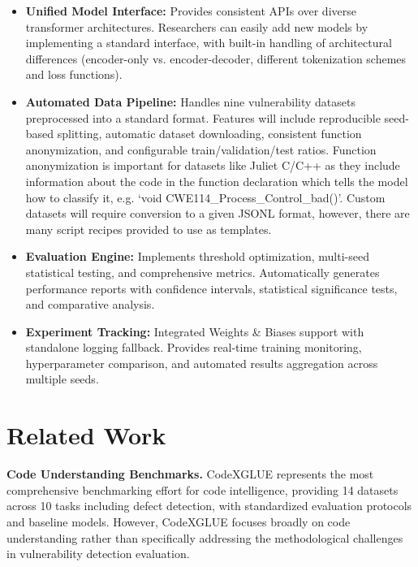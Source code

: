 \documentclass[letterpaper]{article}
\begin{document}
\begin{itemize}
	\item \textbf{Unified Model Interface:} Provides consistent APIs over diverse transformer architectures. Researchers can easily add new models by implementing a standard interface, with built-in handling of architectural differences (encoder-only vs. encoder-decoder, different tokenization schemes and loss functions).

	\item \textbf{Automated Data Pipeline:} Handles nine vulnerability datasets preprocessed into a standard format. Features will include reproducible seed-based splitting, automatic dataset downloading, consistent function anonymization, and configurable train/validation/test ratios. Function anonymization is important for datasets like Juliet C/C++ \citep{juliet2022} as they include information about the code in the function declaration which tells the model how to classify it, e.g. `void CWE114\_Process\_Control\_bad()'. Custom datasets will require conversion to a given JSONL format, however, there are many script recipes provided to use as templates.

	\item \textbf{Evaluation Engine:} Implements threshold optimization, multi-seed statistical testing, and comprehensive metrics. Automatically generates performance reports with confidence intervals, statistical significance tests, and comparative analysis.

	\item \textbf{Experiment Tracking:} Integrated Weights \& Biases support with standalone logging fallback. Provides real-time training monitoring, hyperparameter comparison, and automated results aggregation across multiple seeds.
\end{itemize}

\section{Related Work}

\textbf{Code Understanding Benchmarks.} CodeXGLUE \citep{lu2021codexglue} represents the most comprehensive benchmarking effort for code intelligence, providing 14 datasets across 10 tasks including defect detection, with standardized evaluation protocols and baseline models. However, CodeXGLUE focuses broadly on code understanding rather than specifically addressing the methodological challenges in vulnerability detection evaluation.
\end{document}
